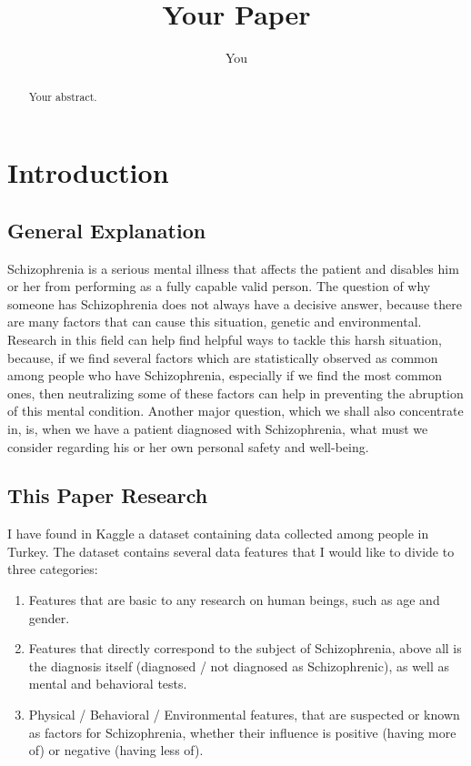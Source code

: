 \documentclass{article}
\title{Your Paper}
\author{You}
\begin{document}
\maketitle

\begin{abstract}
Your abstract.
\end{abstract}

\section{Introduction}
\subsection{General Explanation}
Schizophrenia is a serious mental illness that affects the patient and disables him or her from performing as a fully capable valid person. The question of why someone has Schizophrenia does not always have a decisive answer, because there are many factors that can cause this situation, genetic and environmental. Research in this field can help find helpful ways to tackle this harsh situation, because, if we find several factors which are statistically observed as common among people who have Schizophrenia, especially if we find the most common ones, then neutralizing some of these factors can help in preventing the abruption of this mental condition. Another major question, which we shall also concentrate in, is, when we have a patient diagnosed with Schizophrenia, what must we consider regarding his or her own personal safety and well-being.
\subsection{This Paper Research}
I have found in Kaggle a dataset containing data collected among people in Turkey. The dataset contains several data features that I would like to divide to three categories:
\begin{enumerate}
    \item Features that are basic to any research on human beings, such as age and gender.
    \item Features that directly correspond to the subject of Schizophrenia, above all is the diagnosis itself (diagnosed / not diagnosed as Schizophrenic), as well as mental and behavioral tests.
    \item Physical / Behavioral / Environmental features, that are suspected or known as factors for Schizophrenia, whether their influence is positive (having more of) or negative (having less of).
\end{enumerate}
\end{document}
